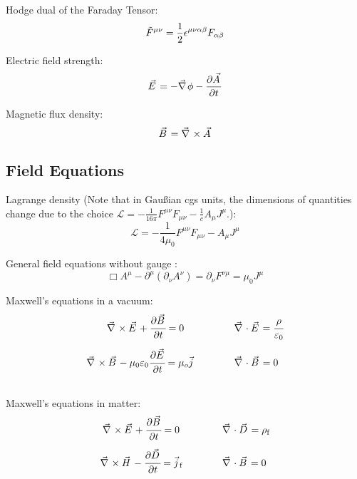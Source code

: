 		\noindent
		Hodge dual of the Faraday Tensor:
		\begin{equation}
			\tilde{F}^{\mu\nu} = \frac{1}{2}\epsilon^{\mu\nu\alpha\beta}F_{\alpha\beta}
		\end{equation}

		\noindent
		Electric field strength:
		\begin{equation}
			\vec{E} = -\Nabla\phi-\pdv{\vec{A}}{t}
		\end{equation}

		\noindent
		Magnetic flux density:
		\begin{equation}
			\vec{B} = \Nabla\times\vec{A}
		\end{equation}


	\subsection{Field Equations}
		\noindent
		Lagrange density (Note that in Gaußian cgs units, the dimensions of quantities change due to the choice $\mathcal{L} = -\frac{1}{16\pi}F^{\mu\nu} F_{\mu\nu} - \frac{1}{c} A_\mu J^\mu$.):
		\begin{equation}
			\mathcal{L} = -\frac{1}{4\mu_0}F^{\mu\nu} F_{\mu\nu} - A_\mu J^\mu
		\end{equation}

		\noindent
		General field equations without gauge :
		\begin{equation}
			\Box A^\mu-\partial^\mu\left(\partial_\nu A^\nu\right) = \partial_\nu F^{\nu\mu} =  \mu_0 J^\mu
		\end{equation}

		\noindent
		Maxwell's equations in a vacuum:
		\begin{equation}
			\begin{array}{rl}
				\vec{\nabla}\times \vec{E} + \cfrac{\partial\vec{B}}{\partial t} = 0 \phantom{\mu_0}
				& \hsp \vec{\nabla}\cdot\vec{E} = \cfrac{\rho}{\varepsilon_0} \\ \xrowht{40pt}
				\vec{\nabla}\times\vec{B} - \mu_0 \varepsilon_0 \cfrac{\partial \vec{E}}{\partial t} = \mu_o\vec{j}
				& \hsp \vec{\nabla}\cdot\vec{B} = 0
			\end{array}
		\end{equation}

		\noindent
		Maxwell's equations in matter:
		\begin{equation}
			\begin{array}{rl}
				\vec{\nabla}\times \vec{E} + \cfrac{\partial\vec{B}}{\partial t} = 0 \phantom{_\text{f}}
				& \hsp \vec{\nabla}\cdot\vec{D} = \rho_\text{f} \\ \xrowht{40pt}
				\vec{\nabla}\times\vec{H} - \cfrac{\partial \vec{D}}{\partial t} = \vec{j}_\text{f}
				& \hsp \vec{\nabla}\cdot\vec{B} = 0
			\end{array}
		\end{equation}

